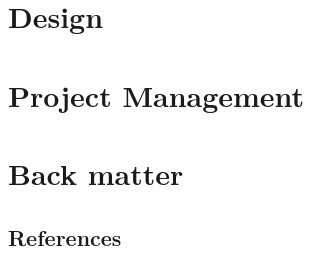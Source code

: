 \documentclass[11pt]{article}
\begin{document}
\newpage
\section{Design}\label{sec:Design}


\newpage
\section{Project Management}


\newpage
\appendix
\section{Back matter}
\subsection{References}
\printbibliography
\end{document}
